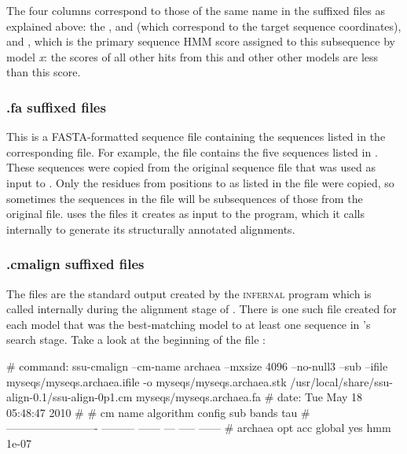 The four columns correspond to those of the same name in the 
suffixed files as explained above: the ,
 and  (which correspond to the target sequence
coordinates), and , which is the primary sequence HMM
score assigned to this subsequence by model \emph{x}: the scores of
all other hits from this and other other models are less than
this score.

\subsubsection{.fa suffixed files}
This is a FASTA-formatted sequence file containing the sequences
listed in the corresponding  file. For example, the
file  contains the five sequences
listed in . These sequences were
copied from the original sequence file  that
was used as input to . Only the residues from
positions  to  as listed in the
 file were copied, so sometimes the sequences in the
 file will be subsequences of those from the original
file.   uses the  files it
creates as input to the  program, which it calls
internally to generate its structurally annotated alignments.

\subsubsection{.cmalign suffixed files}

The  files are the standard output created by the
\textsc{infernal} program  which is called internally
during the alignment stage of . There is one such file
created for each model that was the best-matching model to at least
one sequence in 's search stage. Take a look at the
beginning of the file :

\begin{sreoutput}
# command: ssu-cmalign --cm-name archaea --mxsize 4096 --no-null3 --sub --ifile myseqs/myseqs.archaea.ifile -o myseqs/myseqs.archaea.stk /usr/local/share/ssu-align-0.1/ssu-align-0p1.cm myseqs/myseqs.archaea.fa
# date:    Tue May 18 05:48:47 2010
#
# cm name                    algorithm  config  sub  bands     tau
# -------------------------  ---------  ------  ---  -----  ------
# archaea                      opt acc  global  yes    hmm   1e-07
\end{sreoutput}

